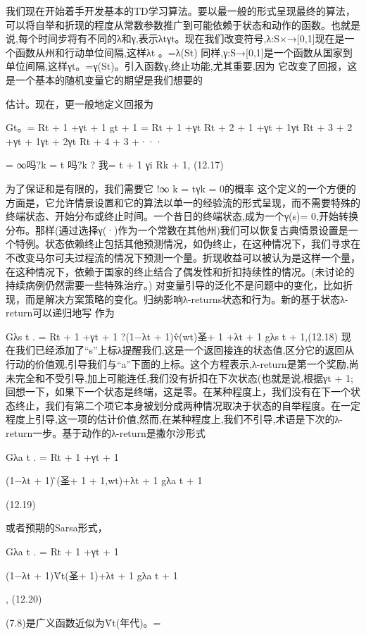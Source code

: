 我们现在开始着手开发基本的TD学习算法。要以最一般的形式呈现最终的算法，可以将自举和折现的程度从常数参数推广到可能依赖于状态和动作的函数。也就是说,每个时间步将有不同的λ和γ,表示λtγt。现在我们改变符号,λ:S×→[0,1]现在是一个函数从州和行动单位间隔,这样λt
。=λ(St)
同样,γ:S→[0,1]是一个函数从国家到单位间隔,这样γt。=γ(St)。引入函数γ,终止功能,尤其重要,因为
它改变了回报，这是一个基本的随机变量它的期望是我们想要的

估计。现在，更一般地定义回报为

Gt。= Rt + 1 +γt + 1 gt + 1
= Rt + 1 +γt Rt + 2 + 1 +γt + 1γt Rt + 3 + 2 +γt + 1γt + 2γt Rt + 4 + 3 +···

=
∞吗?k = t
吗?k ?
我= t + 1
γi
Rk + 1, 					(12.17)

为了保证和是有限的，我们需要它
!∞
k = tγk = 0的概率
这个定义的一个方便的方面是，它允许情景设置和它的算法以单一的经验流的形式呈现，而不需要特殊的终端状态、开始分布或终止时间。一个昔日的终端状态,成为一个γ(s)= 0,开始转换分布。那样(通过选择γ(·)作为一个常数在其他州)我们可以恢复古典情景设置是一个特例。状态依赖终止包括其他预测情况，如伪终止，在这种情况下，我们寻求在不改变马尔可夫过程流的情况下预测一个量。折现收益可以被认为是这样一个量，在这种情况下，依赖于国家的终止结合了偶发性和折扣持续性的情况。(未讨论的持续病例仍然需要一些特殊治疗。)
对变量引导的泛化不是问题中的变化，比如折现，而是解决方案策略的变化。归纳影响λ-returns状态和行为。新的基于状态λ-return可以递归地写
作为

Gλs t
.
= Rt + 1 +γt + 1
?(1−λt + 1)v̂(wt)圣+ 1 +λt + 1 gλs t + 1,(12.18)
现在我们已经添加了“s”上标λ提醒我们,这是一个返回接连的状态值,区分它的返回从行动的价值观,引导我们与“a”下面的上标。这个方程表示,λ-return是第一个奖励,尚未完全和不受引导,加上可能连任,我们没有折扣在下次状态(也就是说,根据γt + 1;回想一下，如果下一个状态是终端，这是零。在某种程度上，我们没有在下一个状态终止，我们有第二个项它本身被划分成两种情况取决于状态的自举程度。在一定程度上引导,这一项的估计价值,然而,在某种程度上,我们不引导,术语是下次的λ-return一步。基于动作的λ-return是撒尔沙形式

Gλa t
.
= Rt + 1 +γt + 1

(1−λt + 1)问̂(圣+ 1 + 1,wt)+λt + 1 gλa t + 1

(12.19)

或者预期的Sarsa形式，

Gλa t
.
= Rt + 1 +γt + 1

(1−λt + 1)V̄t(圣+ 1)+λt + 1 gλa t + 1

, 					(12.20)

(7.8)是广义函数近似为V̄t(年代)。=

